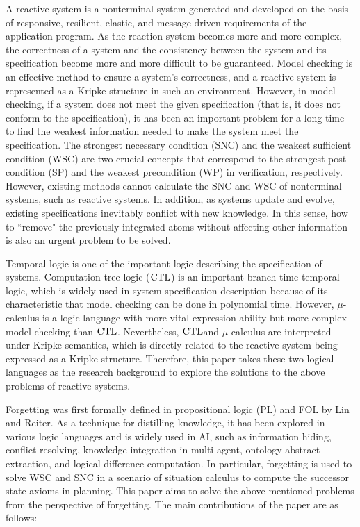 \begin{englishabstract}
A reactive system is a nonterminal system generated and developed on the basis of responsive, resilient, elastic, and message-driven requirements of the application program.  As the reaction system becomes more and more complex, the correctness of a system and the consistency between the system and its specification become more and more difficult to be guaranteed. 	
Model checking is an effective method to ensure a system's correctness, and a reactive system is represented as a Kripke structure in such an environment.  However, in model checking, if a system does not meet the given specification (that is, it does not conform to the specification), it has been an important problem for a long time to find the weakest information needed to make the system meet the specification. 
The strongest necessary condition (SNC) and the weakest sufficient condition (WSC)  are two crucial concepts that correspond to the strongest post-condition (SP) and the weakest precondition (WP) in verification, respectively. However, existing methods cannot calculate the SNC and WSC of nonterminal systems, such as reactive systems. 
In addition, as systems update and evolve, existing specifications inevitably conflict with new knowledge. In this sense, how to ``remove" the previously integrated atoms without affecting other information is also an urgent problem to be solved. 
	
	
Temporal logic is one of the important logic describing the specification of systems.   Computation tree logic ($\textrm{CTL}$) is an important branch-time temporal logic, which is widely used in system specification description because of its characteristic that model checking can be done in polynomial time.  However, $\mu$-calculus is a logic language with more vital expression ability but more complex model checking than $\textrm{CTL}$. 
Nevertheless, $\textrm{CTL}$and $\mu$-calculus are interpreted under Kripke semantics, which is directly related to the reactive system being expressed as a Kripke structure. 
Therefore, this paper takes these two logical languages as the research background to explore the solutions to the above problems of reactive systems. 


Forgetting was first formally defined in propositional logic (PL) and FOL by Lin and Reiter. As a technique for distilling knowledge, it has been explored in various logic languages and is widely used in AI, such as information hiding, conflict resolving, knowledge integration in multi-agent, ontology abstract extraction, and logical difference computation. In particular, forgetting is used to solve WSC and SNC in a scenario of situation calculus to compute the successor state axioms in planning. This paper aims to solve the above-mentioned problems from the perspective of forgetting. The main contributions of the paper are as follows: 



\end{englishabstract}
